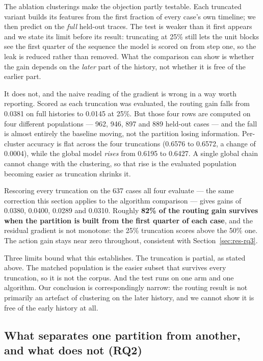 The ablation clusterings make the objection partly testable. Each truncated variant builds its
features from the first fraction of every case's own timeline; we then predict on the \emph{full}
held-out traces. The test is weaker than it first appears and we state its limit before its
result: truncating at 25\% still lets the unit blocks see the first quarter of the sequence the
model is scored on from step one, so the leak is reduced rather than removed. What the
comparison can show is whether the gain depends on the \emph{later} part of the history, not
whether it is free of the earlier part.

It does not, and the naive reading of the gradient is wrong in a way worth reporting. Scored as
each truncation was evaluated, the routing gain falls from 0.0381 on full histories to 0.0145 at
25\%. But those four rows are computed on four different populations --- 962, 946, 897 and 889
held-out cases --- and the fall is almost entirely the baseline moving, not the partition losing
information. Per-cluster accuracy is flat across the four truncations (0.6576 to 0.6572, a
change of 0.0004), while the global model \emph{rises} from 0.6195 to 0.6427. A single global
chain cannot change with the clustering, so that rise is the evaluated population becoming
easier as truncation shrinks it.

Rescoring every truncation on the 637 cases all four evaluate --- the same correction this
section applies to the algorithm comparison --- gives gains of 0.0380, 0.0400, 0.0289 and
0.0310. Roughly \textbf{82\% of the routing gain survives when the partition is built from the
first quarter of each case}, and the residual gradient is not monotone: the 25\% truncation
scores above the 50\% one. The action gain stays near zero throughout, consistent with
Section~\ref{sec:res-rq3}.

Three limits bound what this establishes. The truncation is partial, as stated above. The
matched population is the easier subset that survives every truncation, so it is not the corpus.
And the test runs on one arm and one algorithm. Our conclusion is correspondingly narrow: the
routing result is not primarily an artefact of clustering on the later history, and we cannot
show it is free of the early history at all.





\subsection{What separates one partition from another, and what does not (RQ2)}\label{sec:res-rq2}

